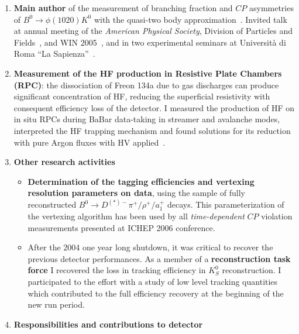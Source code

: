 \documentclass[11pt,twoside,a4paper]{article}
\begin{document}
\begin{enumerate}
\item {\bf Main author} of the measurement of branching fraction and
  $CP$ asymmetries of $B^0\to\phi(1020) K^0$ with the quasi-two body
  approximation~\cite{Aubert:2005ja}.  Invited talk at annual meeting
  of the {\it American Physical Society}, Division of Particles and
  Fields~\cite{conf_aps}, and WIN 2005~\cite{conf_win05}, and in two
  experimental seminars at Universit\`a di Roma ``La
  Sapienza''~\cite{seminario_roma1_1,seminario_roma1_2}.

\item {\bf Measurement of the HF production in Resistive Plate
  Chambers (RPC)}: the dissociation of Freon 134a due to gas
  discharges can produce significant concentration of HF, reducing
  the superficial resistivity with consequent efficiency loss of the
  detector. I measured the production of HF on in situ RPCs during
  BaBar data-taking in streamer and avalanche modes, interpreted the
  HF trapping mechanism and found solutions for its reduction with
  pure Argon fluxes with HV applied~\cite{Band:2008zzb}.
  
  
\item {\bf Other research activities}
  
  \begin{itemize}
    
    
  \item {\bf Determination of the tagging efficiencies and vertexing
    resolution parameters on data}, using the sample of fully
    reconstructed $B^0 \rightarrow D^{(*)-}\pi^+/\rho^+/a_1^+$
    decays. This parameterization of the vertexing algorithm has been
    used by all {\it time-dependent} $CP$ violation measurements
    presented at ICHEP 2006 conference.

  \item After the 2004 one year long shutdown, it was critical to
    recover the previous detector performances. As a member of a
    {\bf reconstruction task force} I recovered the loss in tracking
    efficiency in $K^0_S$ reconstruction. I participated to the effort
    with a study of low level tracking quantities which contributed to
    the full efficiency recovery at the beginning of the new run period.

  \end{itemize}

\item {\bf Responsibilities and contributions to detector}
  
  \begin{itemize}
    

\end{itemize}
\end{enumerate}
\end{document}
